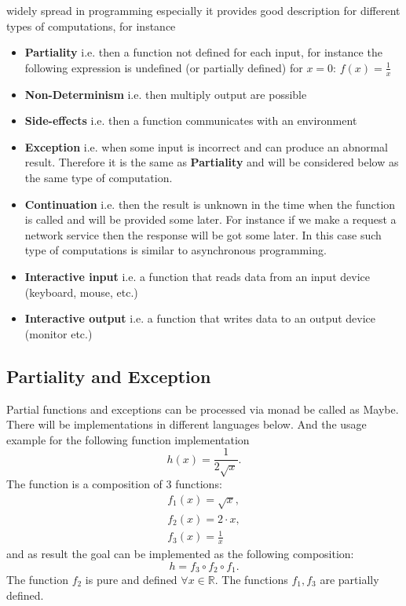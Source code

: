  widely spread in programming
especially it provides good description for different types of
computations, for instance \cite{bib:Moggi91, bib:milewski2018category} 
\begin{itemize}
\item \textbf{Partiality} i.e. then a function not defined for each input, for
  instance the following expression is undefined (or partially
  defined) for $x = 0$: $f(x) = \frac{1}{x}$
\item \textbf{Non-Determinism} i.e. then multiply output are possible
\item \textbf{Side-effects} i.e. then a function communicates with
  an environment
\item \textbf{Exception} i.e. when some input is incorrect and can
  produce an abnormal result. Therefore it is the same as
  \textbf{Partiality} and will be considered below as the same type of
  computation. 
\item \textbf{Continuation} i.e. then the result is unknown in the
  time when the function is called and will be provided some later.
  For instance if we make a request a network service then the
  response will be got some later. In this case such type of
  computations is similar to asynchronous programming.
\item \textbf{Interactive input} i.e. a function that reads data from
  an input device (keyboard, mouse, etc.)
\item \textbf{Interactive output} i.e. a function that writes data to
an output device (monitor etc.)
\end{itemize}

\subsection{Partiality and Exception}

Partial functions and exceptions can be processed via monad be called
as Maybe. There will be implementations in different languages below.
And the usage example for the following function implementation
\[
h(x) = \frac{1}{2 \sqrt{x}}.
\]
The function is a composition of 3 functions:
\begin{eqnarray}
f_1(x) = \sqrt{x},
\nonumber \\
f_2(x) = 2 \cdot x,
\nonumber \\
f_3(x) = \frac{1}{x}
\label{eq:monadmaybe_ex_f}
\end{eqnarray}
and as result the goal can be implemented as the following
composition:
\begin{equation}
h = f_3 \circ f_2 \circ f_1.
\label{eq:monadmaybe_ex_h}
\end{equation}
The function $f_2$ is pure and defined $\forall x \in \mathbb{R}$. The
functions $f_1, f_3$ are partially defined.

